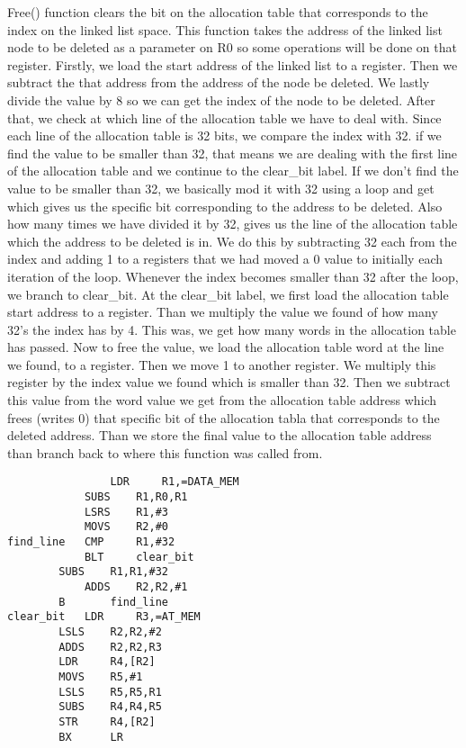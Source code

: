 \documentclass[pdftex,12pt,a4paper]{article}
\begin{document}
Free() function clears the bit on the allocation table that corresponds to the index on the linked list space. This function takes the address of the linked list node to be deleted as a parameter on R0 so some operations will be done on that register. Firstly, we load the start address of the linked list to a register. Then we subtract the that address from the address of the node be deleted. We lastly divide the value by 8 so we can get the index of the node to be deleted. After that, we check at which line of the allocation table we have to deal with. Since each line of the allocation table is 32 bits, we compare the index with 32. if we find the value to be smaller than 32, that means we are dealing with the first line of the allocation table and we continue to the clear\_bit label. If we don't find the value to be smaller than 32, we basically mod it with 32 using a loop and get which gives us the specific bit corresponding to the address to be deleted. Also how many times we have divided it by 32, gives us the line of the allocation table which the address to be deleted is in.  We do this by subtracting 32 each from the index and adding 1 to a registers that we had moved a 0 value to initially each iteration of the loop. Whenever the index becomes smaller than 32 after the loop, we branch to clear\_bit. At the clear\_bit label, we first load the allocation table start address to a register. Than we multiply the value we found of how many 32's the index has by 4. This was, we get how many words in the allocation table has passed. Now to free the value, we load the allocation table word at the line we found, to a register. Then we move 1 to another register. We multiply this register by the index value we found which is smaller than 32. Then we subtract this value from the word value we get from the allocation table address which frees (writes 0) that specific bit of the allocation tabla that corresponds to the deleted address. Than we store the final value to the allocation table address than branch back to where this function was called from. 

\begin{lstlisting}
                LDR     R1,=DATA_MEM					
        	SUBS    R1,R0,R1					
        	LSRS    R1,#3							
        	MOVS    R2,#0						
find_line	CMP     R1,#32 						
        	BLT     clear_bit					
		SUBS    R1,R1,#32						
	        ADDS    R2,R2,#1					
		B       find_line						
clear_bit	LDR     R3,=AT_MEM					
		LSLS    R2,R2,#2					
		ADDS    R2,R2,R3					
		LDR     R4,[R2]						
		MOVS    R5,#1						
		LSLS    R5,R5,R1						
		SUBS    R4,R4,R5					
		STR     R4,[R2]						
		BX      LR	
\end{lstlisting}
\end{document}
